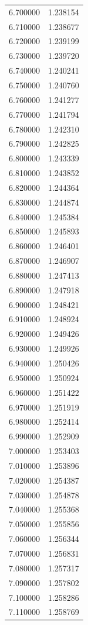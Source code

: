 \begin{tabular}{rr}
6.700000 & 1.238154 \\
6.710000 & 1.238677 \\
6.720000 & 1.239199 \\
6.730000 & 1.239720 \\
6.740000 & 1.240241 \\
6.750000 & 1.240760 \\
6.760000 & 1.241277 \\
6.770000 & 1.241794 \\
6.780000 & 1.242310 \\
6.790000 & 1.242825 \\
6.800000 & 1.243339 \\
6.810000 & 1.243852 \\
6.820000 & 1.244364 \\
6.830000 & 1.244874 \\
6.840000 & 1.245384 \\
6.850000 & 1.245893 \\
6.860000 & 1.246401 \\
6.870000 & 1.246907 \\
6.880000 & 1.247413 \\
6.890000 & 1.247918 \\
6.900000 & 1.248421 \\
6.910000 & 1.248924 \\
6.920000 & 1.249426 \\
6.930000 & 1.249926 \\
6.940000 & 1.250426 \\
6.950000 & 1.250924 \\
6.960000 & 1.251422 \\
6.970000 & 1.251919 \\
6.980000 & 1.252414 \\
6.990000 & 1.252909 \\
7.000000 & 1.253403 \\
7.010000 & 1.253896 \\
7.020000 & 1.254387 \\
7.030000 & 1.254878 \\
7.040000 & 1.255368 \\
7.050000 & 1.255856 \\
7.060000 & 1.256344 \\
7.070000 & 1.256831 \\
7.080000 & 1.257317 \\
7.090000 & 1.257802 \\
7.100000 & 1.258286 \\
7.110000 & 1.258769 \\

\end{tabular}
